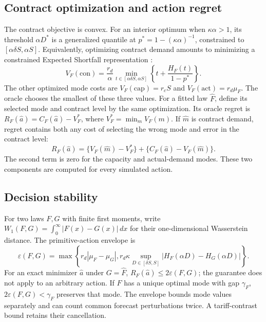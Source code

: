 \documentclass[suppldata]{interact}
\begin{document}
\subsection{Contract optimization and action regret}
\label{sec:contract-optimization}
The contract objective is convex. For an interior optimum when
$\kappa\alpha>1$, its threshold $\alpha D^*$ is a generalized quantile
at $p^*=1-(\kappa\alpha)^{-1}$, constrained to
$[\alpha\delta S,\alpha S]$. Equivalently, optimizing contract
demand amounts to minimizing a constrained Expected Shortfall
representation \citep{RockafellarUryasev2002}:
\begin{equation}
\label{eq:contract-constrained-es}
V_F(\mathrm{con})=
\frac{r_d}{\alpha}
\min_{t\in[\alpha\delta S,\alpha S]}
\left\{t+\frac{H_F(t)}{1-p^*}\right\}.
\end{equation}
The other optimized mode costs are $V_F(\mathrm{cap})=r_cS$ and
$V_F(\mathrm{act})=r_d\mu_F$. The oracle chooses the smallest of these
three values. For a fitted law $\widehat F$, define its selected
mode and contract level by the same optimization. Its oracle regret is
$R_F(\widehat a)=C_F(\widehat a)-V_F^*$, where
$V_F^*=\min_m V_F(m)$. If $\widehat m$ is contract demand, regret
contains both any cost of selecting the wrong mode and error in the
contract level:
\begin{equation}
\label{eq:within-contract-loss}
R_F(\widehat a)=
\{V_F(\widehat m)-V_F^*\}
+\{C_F(\widehat a)-V_F(\widehat m)\}.
\end{equation}
The second term is zero for the capacity and actual-demand modes.
These two components are computed for every simulated action.

\subsection{Decision stability}
For two laws $F,G$ with finite first moments, write
$W_1(F,G)=\int_0^\infty|F(x)-G(x)|\,dx$ for their one-dimensional
Wasserstein distance. The primitive-action envelope is
\begin{equation}
\label{eq:epsilon}
\varepsilon(F,G)=
\max\!\left\{r_d|\mu_F-\mu_G|,
r_d\kappa\sup_{D\in[\delta S,S]}
|H_F(\alpha D)-H_G(\alpha D)|\right\}.
\end{equation}
For an exact minimizer $\widehat a$ under $G=\widehat F$,
$R_F(\widehat a)\leq2\varepsilon(F,G)$; the guarantee does not
apply to an arbitrary action. If $F$ has a unique optimal mode with
gap $\gamma_F$, $2\varepsilon(F,G)<\gamma_F$ preserves that mode.
The envelope bounds mode values separately and can count common
forecast perturbations twice. A tariff-contrast bound retains their
cancellation.
\end{document}
